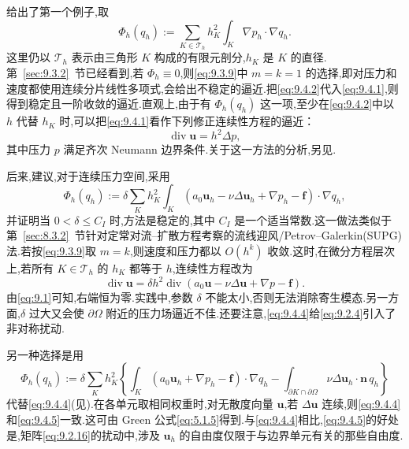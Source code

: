 给出了第一个例子,取
\begin{equation}\label{eq:9.4.2}
  \Phi_h(q_h):=\sum_{K\in\mathcal T_h}h_K^2\int_K\nabla p_h\cdot\nabla q_h.
\end{equation}
这里仍以 \(\mathcal T_h\) 表示由三角形 \(K\) 构成的有限元剖分,\(h_K\) 是 \(K\) 的直径.第~\ref{sec:9.3.2}~节已经看到,若 \(\Phi_h\equiv0\),则\eqref{eq:9.3.9}中 \(m=k=1\) 的选择,即对压力和速度都使用连续分片线性多项式,会给出不稳定的逼近.把\eqref{eq:9.4.2}代入\eqref{eq:9.4.1},则得到稳定且一阶收敛的逼近.直观上,由于有 \(\Phi_h(q_h)\) 这一项,至少在\eqref{eq:9.4.2}中以 \(h\) 代替 \(h_K\) 时,可以把\eqref{eq:9.4.1}看作下列修正连续性方程的逼近：
\begin{equation}\label{eq:9.4.3}
  \operatorname{div}\boldsymbol{u}=h^2\Delta p,
\end{equation}
其中压力 \(p\) 满足齐次 Neumann 边界条件.关于这一方法的分析,另见.

后来,建议,对于连续压力空间,采用
\begin{equation}\label{eq:9.4.4}
  \Phi_h(q_h):=\delta\sum_K h_K^2\int_K
      (a_0\boldsymbol{u}_h-\nu\Delta\boldsymbol{u}_h+\nabla p_h-\boldsymbol{f})\cdot\nabla q_h,
\end{equation}
并证明当 \(0<\delta\le C_I\) 时,方法是稳定的,其中 \(C_I\) 是一个适当常数.这一做法类似于第~\ref{sec:8.3.2}~节针对定常对流--扩散方程考察的流线迎风/Petrov--Galerkin(SUPG)法.若按\eqref{eq:9.3.9}取 \(m=k\),则速度和压力都以 \(O(h^k)\) 收敛.这时,在微分方程层次上,若所有 \(K\in\mathcal T_h\) 的 \(h_K\) 都等于 \(h\),连续性方程改为
\[
  \operatorname{div}\boldsymbol{u}
    =\delta h^2\operatorname{div}(a_0\boldsymbol{u}-\nu\Delta\boldsymbol{u}+\nabla p-\boldsymbol{f}).
\]
由\eqref{eq:9.1}可知,右端恒为零.实践中,参数 \(\delta\) 不能太小,否则无法消除寄生模态.另一方面,\(\delta\) 过大又会使 \(\partial\Omega\) 附近的压力场逼近不佳.还要注意,\eqref{eq:9.4.4}给\eqref{eq:9.2.4}引入了非对称扰动.

另一种选择是用
\begin{equation}\label{eq:9.4.5}
  \Phi_h(q_h):=\delta\sum_K h_K^2\left\{
     \int_K(a_0\boldsymbol{u}_h+\nabla p_h-\boldsymbol{f})\cdot\nabla q_h
     -\int_{\partial K\cap\partial\Omega}\nu\Delta\boldsymbol{u}_h\cdot\boldsymbol{n}\,q_h
    \right\}
\end{equation}
代替\eqref{eq:9.4.4}(见).在各单元取相同权重时,对无散度向量 \(\boldsymbol{u}\),若 \(\Delta\boldsymbol{u}\) 连续,则\eqref{eq:9.4.4}和\eqref{eq:9.4.5}一致.这可由 Green 公式\eqref{eq:5.1.5}得到.与\eqref{eq:9.4.4}相比,\eqref{eq:9.4.5}的好处是,矩阵\eqref{eq:9.2.16}的扰动中,涉及 \(\boldsymbol{u}_h\) 的自由度仅限于与边界单元有关的那些自由度.

